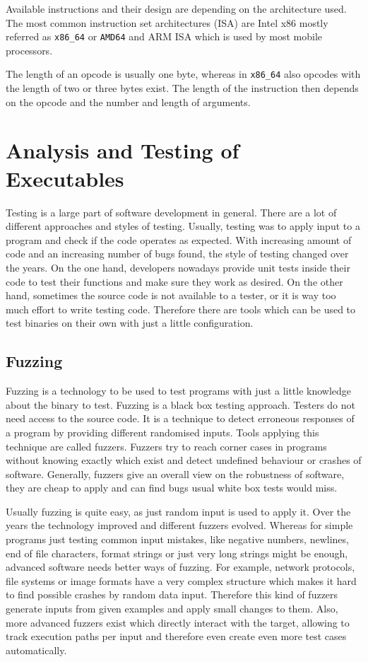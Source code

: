Available instructions and their design are depending on the architecture used.
The most common instruction set architectures (ISA) are Intel x86 mostly
referred as \texttt{x86\_64} or \texttt{AMD64} and ARM ISA which is used by most
mobile processors.

The length of an opcode is usually one byte, whereas in \texttt{x86\_64} also
opcodes with the length of two or three bytes exist. The length of the
instruction then depends on the opcode and the number and length of arguments.


\section{Analysis and Testing of Executables}

Testing is a large part of software development in general. There are a lot of
different approaches and styles of testing. Usually, testing was to apply input
to a program and check if the code operates as expected. With increasing amount
of code and an increasing number of bugs found, the style of testing changed
over the years. On the one hand, developers nowadays provide unit tests inside
their code to test their functions and make sure they work as desired. On the
other hand, sometimes the source code is not available to a tester, or it is way
too much effort to write testing code. Therefore there are tools which can be
used to test binaries on their own with just a little configuration.

\subsection{Fuzzing}

Fuzzing is a technology to be used to test programs with just a little knowledge
about the binary to test. Fuzzing is a black box testing approach. Testers do
not need access to the source code. It is a technique to detect erroneous
responses of a program by providing different randomised inputs. Tools applying
this technique are called fuzzers. Fuzzers try to reach corner cases in programs
without knowing exactly which exist and detect undefined behaviour or crashes of
software. Generally, fuzzers give an overall view on the robustness of software,
they are cheap to apply and can find bugs usual white box tests would miss.

Usually fuzzing is quite easy, as just random input is used to apply it. Over
the years the technology improved and different fuzzers evolved. Whereas for
simple programs just testing common input mistakes, like negative numbers,
newlines, end of file characters, format strings or just very long strings might
be enough, advanced software needs better ways of fuzzing. For example, network
protocols, file systems or image formats have a very complex structure which
makes it hard to find possible crashes by random data input. Therefore this kind
of fuzzers generate inputs from given examples and apply small changes to them.
Also, more advanced fuzzers exist which directly interact with the target,
allowing to track execution paths per input and therefore even create even more
test cases automatically.

